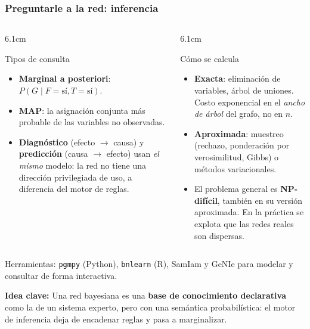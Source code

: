 \documentclass[aspectratio=169, 10pt]{beamer}
\newcommand{\idea}[1]{%
	\begin{tcolorbox}[colback=AccentGreen!6, colframe=AccentGreen, arc=3pt,
		width=\textwidth, boxsep=1pt, left=5pt, right=5pt, top=2pt, bottom=2pt,
		fontupper=\small]
		\RaggedRight\textbf{Idea clave:} #1
	\end{tcolorbox}
}
\begin{document}
\begin{frame}
\frametitle{Preguntarle a la red: inferencia}
\begin{columns}[T]
\begin{column}{6.1cm}
\begin{block}{Tipos de consulta}
\footnotesize
\begin{itemize}
	\item \textbf{Marginal a posteriori}: $P(G \mid F{=}\text{sí}, T{=}\text{sí})$.
	\item \textbf{MAP}: la asignación conjunta más probable de las variables no observadas.
	\item \textbf{Diagnóstico} (efecto $\to$ causa) y \textbf{predicción} (causa $\to$ efecto) usan \emph{el mismo} modelo: la red no tiene una dirección privilegiada de uso, a diferencia del motor de reglas.
\end{itemize}
\end{block}
\end{column}
\begin{column}{6.1cm}
\begin{block}{Cómo se calcula}
\footnotesize
\begin{itemize}
	\item \textbf{Exacta}: eliminación de variables, árbol de uniones. Costo exponencial en el \emph{ancho de árbol} del grafo, no en $n$.
	\item \textbf{Aproximada}: muestreo (rechazo, ponderación por verosimilitud, Gibbs) o métodos variacionales.
	\item El problema general es \textbf{NP-difícil}, también en su versión aproximada. En la práctica se explota que las redes reales son dispersas.
\end{itemize}
\end{block}
\end{column}
\end{columns}
\vspace{0.3em}
\footnotesize Herramientas: \texttt{pgmpy} (Python), \texttt{bnlearn} (R), SamIam y GeNIe para modelar y consultar de forma interactiva.
\vspace{0.2em}
\idea{Una red bayesiana es una \textbf{base de conocimiento declarativa} como la de un sistema experto, pero con una semántica probabilística: el motor de inferencia deja de encadenar reglas y pasa a marginalizar.}
\end{frame}
\end{document}
